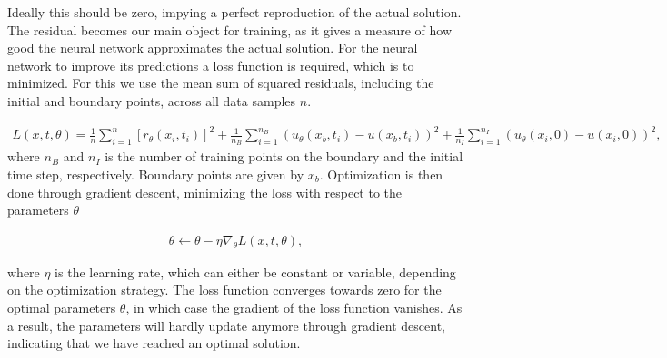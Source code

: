 \documentclass[12pt]{extarticle}
\begin{document}
Ideally this should be zero, impying a perfect reproduction of the actual solution. The residual becomes our main object for training, as it gives a measure of how good the neural network approximates the actual solution. For the neural network to improve its predictions a loss function is required, which is to minimized. For this we use the mean sum of squared residuals, including the initial and boundary points, across all data samples $n$. 

\begin{align*}
	L(x, t, \theta) = \frac{1}{n} \sum_{i=1}^n [r_\theta(x_i,t_i)]^2 + \frac{1}{n_B}\sum_{i=1}^{n_B} (u_{\theta}(x_b,t_i) - u(x_b,t_i))^2 + \frac{1}{n_I} \sum_{i=1}^{n_I} (u_{\theta}(x_i,0) - u(x_i,0))^2,
\end{align*}
where $n_B$ and $n_I$ is the number of training points on the boundary and the initial time step, respectively. Boundary points are given by $x_b$.
Optimization is then done through gradient descent, minimizing the loss with respect to the parameters $\theta$

\begin{align*}
	\theta \leftarrow \theta - \eta \nabla_{\theta}L(x,t,\theta),
\end{align*}

where $\eta$ is the learning rate, which can either be constant or variable, depending on the optimization strategy.
The loss function converges towards zero for the optimal parameters $\theta$, in which case the gradient of the loss function vanishes. As a result, the parameters will hardly update anymore through gradient descent, indicating that we have reached an optimal solution.
\end{document}
